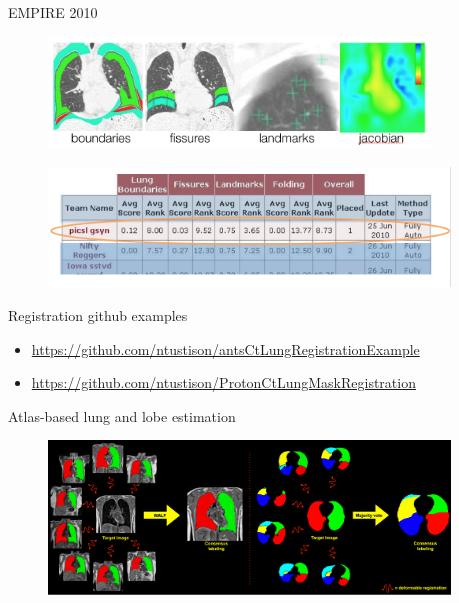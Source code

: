 \documentclass[ignorenonframetext,]{beamer}
\begin{document}
\begin{frame}{EMPIRE 2010}

\centering

\begin{figure}
  \includegraphics[width=0.9\textwidth]{./competitions/figures/EMPIRE10criteria.png}
\end{figure}

\centering

\begin{figure}
  \includegraphics[width=0.95\textwidth]{./competitions/figures/EMPIRE10Results.png}
\end{figure}

\end{frame}

\begin{frame}{Registration github examples}

\begin{itemize}
\item
  \url{https://github.com/ntustison/antsCtLungRegistrationExample}
\item
  \url{https://github.com/ntustison/ProtonCtLungMaskRegistration}
\end{itemize}

\end{frame}

\begin{frame}{Atlas-based lung and lobe estimation}

\centering

\begin{figure}
\includegraphics[width=0.95\textwidth]{./lung/figures/malfLungsBoth.pdf}
\end{figure}

\end{frame}
\end{document}

